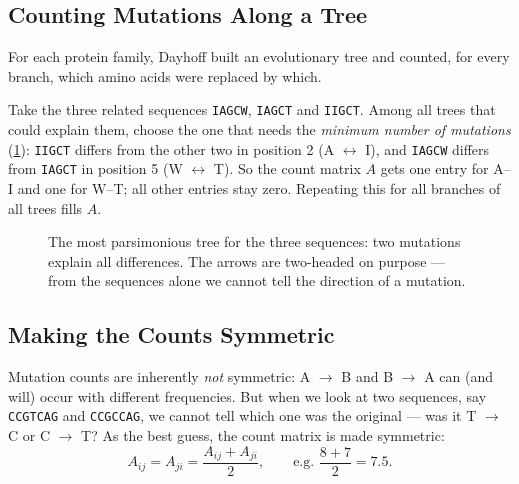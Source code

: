 \documentclass[11pt, oneside]{book}
\newcommand{\seq}[1]{\texttt{#1}}
\let\originalsubsection\subsection
\renewcommand{\subsection}{\Needspace{6\baselineskip}\originalsubsection}
\begin{document}
\subsection{Counting Mutations Along a Tree}

For each protein family, Dayhoff built an evolutionary tree and counted, for
every branch, which amino acids were replaced by which.

\begin{exbox}[title={Three sequences, one tree}]
Take the three related sequences \seq{IAGCW}, \seq{IAGCT} and \seq{IIGCT}.
Among all trees that could explain them, choose the one that needs the
\emph{minimum number of mutations} (\cref{fig:pam-tree}): \seq{IIGCT} differs
from the other two in position 2 (A $\leftrightarrow$ I), and \seq{IAGCW}
differs from \seq{IAGCT} in position 5 (W $\leftrightarrow$ T). So the count
matrix $A$ gets one entry for A--I and one for W--T; all other entries stay
zero. Repeating this for all branches of all trees fills $A$.
\end{exbox}

\begin{figure}[htbp]
\centering
{}
\caption{The most parsimonious tree for the three sequences: two mutations
explain all differences. The arrows are two-headed on purpose --- from the
sequences alone we cannot tell the direction of a mutation.}
\label{fig:pam-tree}
\end{figure}

\subsection{Making the Counts Symmetric}

Mutation counts are inherently \emph{not} symmetric: A $\to$ B and B $\to$ A
can (and will) occur with different frequencies. But when we look at two
sequences, say \seq{CCGTCAG} and \seq{CCGCCAG}, we cannot tell which one was
the original --- was it T $\to$ C or C $\to$ T? As the best guess, the count
matrix is made symmetric:
\[
  A_{ij} = A_{ji} = \frac{A_{ij} + A_{ji}}{2},
  \qquad\text{e.g.\ } \frac{8 + 7}{2} = 7.5 .
\]
\end{document}
